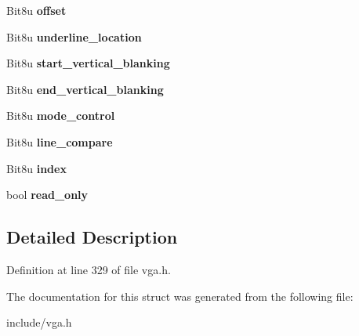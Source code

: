 \begin{DoxyCompactItemize}
\item 
\hypertarget{structVGA__Crtc_a4924ee33276c5db26c158fdf870a6dd8}{Bit8u {\bfseries offset}}\label{structVGA__Crtc_a4924ee33276c5db26c158fdf870a6dd8}

\item 
\hypertarget{structVGA__Crtc_a2219c487b03bb85f3ee0588f98d1d6a6}{Bit8u {\bfseries underline\-\_\-location}}\label{structVGA__Crtc_a2219c487b03bb85f3ee0588f98d1d6a6}

\item 
\hypertarget{structVGA__Crtc_a05e8dd8080f625dceb9b0f4b3306a346}{Bit8u {\bfseries start\-\_\-vertical\-\_\-blanking}}\label{structVGA__Crtc_a05e8dd8080f625dceb9b0f4b3306a346}

\item 
\hypertarget{structVGA__Crtc_a85198ae7825925a3350637af0e91ddc9}{Bit8u {\bfseries end\-\_\-vertical\-\_\-blanking}}\label{structVGA__Crtc_a85198ae7825925a3350637af0e91ddc9}

\item 
\hypertarget{structVGA__Crtc_a4786b1dec0548282000ee6842cdc818f}{Bit8u {\bfseries mode\-\_\-control}}\label{structVGA__Crtc_a4786b1dec0548282000ee6842cdc818f}

\item 
\hypertarget{structVGA__Crtc_a5a1744696d3efa6453e94c7283df9cb6}{Bit8u {\bfseries line\-\_\-compare}}\label{structVGA__Crtc_a5a1744696d3efa6453e94c7283df9cb6}

\item 
\hypertarget{structVGA__Crtc_a25c4b8626ae66354a428340e0cfbc231}{Bit8u {\bfseries index}}\label{structVGA__Crtc_a25c4b8626ae66354a428340e0cfbc231}

\item 
\hypertarget{structVGA__Crtc_a4775a262d32dd75cede031b15845a1eb}{bool {\bfseries read\-\_\-only}}\label{structVGA__Crtc_a4775a262d32dd75cede031b15845a1eb}

\end{DoxyCompactItemize}


\subsection{Detailed Description}


Definition at line 329 of file vga.\-h.



The documentation for this struct was generated from the following file\-:\begin{DoxyCompactItemize}
\item 
include/vga.\-h\end{DoxyCompactItemize}
